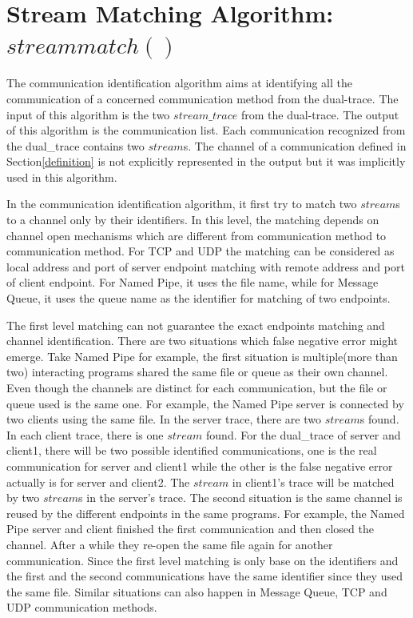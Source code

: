 \section{Stream Matching Algorithm: $streammatch()$}\label{streammatch}
The communication identification algorithm aims at identifying all the communication of a concerned communication method from the dual-trace. The input of this algorithm is the two $stream\_trace$ from the dual-trace. The output of this algorithm is the communication list. Each communication recognized from the dual\_trace contains two $stream$s. The channel of a communication defined in Section\ref{definition} is not explicitly represented in the output but it was implicitly used in this algorithm. 

In the communication identification algorithm, it first try to match two $stream$s to a channel only by their identifiers. In this level, the matching depends on channel open mechanisms which are different from communication method to communication method. For TCP and UDP the matching can be considered as local address and port of server endpoint matching with remote address and port of client endpoint. For Named Pipe, it uses the file name, while for Message Queue, it uses the queue name as the identifier for matching of two endpoints. 

The first level matching can not guarantee the exact endpoints matching and channel identification. There are two situations which false negative error might emerge. Take Named Pipe for example, the first situation is multiple(more than two) interacting programs shared the same file or queue as their own channel. Even though the channels are distinct for each communication, but the file or queue used is the same one. For example, the Named Pipe server is connected by two clients using the same file. In the server trace, there are two $stream$s found. In each client trace, there is one $stream$ found. For the dual\_trace of server and client1, there will be two possible identified communications, one is the real communication for server and client1 while the other is the false negative error actually is for server and client2. The $stream$ in client1's trace will be matched by two $stream$s in the server's trace. The second situation is the same channel is reused by the different endpoints in the same programs. For example, the Named Pipe server and client finished the first communication and then closed the channel. After a while they re-open the same file again for another communication. Since the first level matching is only base on the identifiers and the first and the second communications have the same identifier since they used the same file. Similar situations can also happen in Message Queue, TCP and UDP communication methods. 

